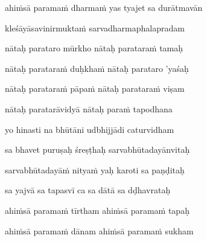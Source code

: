 ahiṁsā paramaṁ dharmaṁ yas tyajet sa durātmavān\thinspace{\dandab} \dontdisplaylinenum

kleśāyāsavinirmuktaṁ sarvadharmaphalapradam \veg\dontdisplaylinenum
{}

nātaḥ parataro mūrkho nātaḥ parataraṁ tamaḥ\thinspace{\dandab} \dontdisplaylinenum

nātaḥ parataraṁ duḥkhaṁ nātaḥ parataro 'yaśaḥ \veg\dontdisplaylinenum
{}

nātaḥ parataraṁ pāpaṁ nātaḥ parataraṁ viṣam\thinspace{\dandab} \dontdisplaylinenum

nātaḥ paratarāvidyā nātaḥ paraṁ tapodhana \veg\dontdisplaylinenum
{}

yo hinasti na bhūtāni udbhijjādi caturvidham\thinspace{\dandab} \dontdisplaylinenum

sa bhavet puruṣaḥ śreṣṭhaḥ sarvabhūtadayānvitaḥ \veg\dontdisplaylinenum
{}

sarvabhūtadayāṁ nityaṁ yaḥ karoti sa paṇḍitaḥ\thinspace{\dandab} \dontdisplaylinenum

sa yajvā sa tapasvī ca sa dātā sa dḍhavrataḥ \veg\dontdisplaylinenum
{}

ahiṁsā paramaṁ tīrtham ahiṁsā paramaṁ tapaḥ\thinspace{\dandab} \dontdisplaylinenum

ahiṁsā paramaṁ dānam ahiṁsā paramaṁ sukham \veg\dontdisplaylinenum

